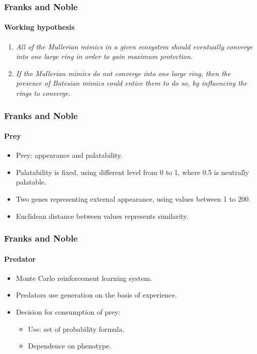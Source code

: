 \frame
{
	\frametitle{Franks and Noble}
	\framesubtitle{Working hypothesis}

	\begin{enumerate}
		\item \textsl{All of the Mullerian mimics in a given ecosystem should eventually converge into one large ring in order to gain maximum protection.}
		\item \textsl{If the Mullerian mimics do not converge into one large ring, then the presence of Batesian mimics could entice them to do so, by influencing the rings to converge.}
	\end{enumerate}
}

\frame
{
	\frametitle{Franks and Noble}
	\framesubtitle{Prey}

	\begin{itemize}
		\item Prey: appearance and palatability.
		\item Palatability is fixed, using different level from 0 to 1, where 0.5 is neutrally palatable.
		\item Two genes representing external appearance, using values between 1 to 200.
		\item Euclidean distance between values represents similarity.
	\end{itemize}
}

\frame
{
	\frametitle{Franks and Noble}
	\framesubtitle{Predator}

	\begin{itemize}
		\item Monte Carlo reinforcement learning system.
		\item Predators use generation on the basis of experience.
		\item Decision for consumption of prey:
		\begin{itemize}
			\item Use: set of probability formula.
			\item Dependence on phenotype.
		\end{itemize}
	\end{itemize}
}

